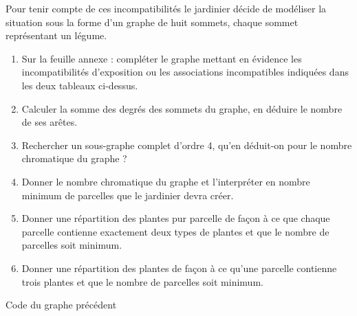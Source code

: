 Pour tenir compte de ces incompatibilités le jardinier décide de modéliser la situation sous la forme d'un graphe de huit sommets, chaque sommet représentant un légume.
\medskip
\begin{enumerate}
\item Sur la feuille annexe : compléter le graphe mettant en évidence les incompatibilités d'exposition ou les associations incompatibles indiquées dans les deux tableaux ci-dessus.

\item Calculer la somme des degrés des sommets du graphe, en déduire le nombre de ses arêtes.

\item Rechercher un sous-graphe complet d'ordre 4, qu'en déduit-on pour le nombre chromatique du graphe ?

\item Donner le nombre chromatique du graphe et l'interpréter en nombre minimum de parcelles que le jardinier devra créer.

\item Donner une répartition des plantes pur parcelle de façon à ce que chaque parcelle contienne exactement deux types de plantes et que le nombre de parcelles soit minimum.

\item Donner une répartition des plantes de façon à ce qu'une parcelle contienne trois plantes et que le nombre de parcelles soit minimum.
\end{enumerate}

\medskip
\begin{center}
\end{center}

\vfill\newpage
Code du graphe précédent

\bigskip
\begin{tkzexample}
\end{tkzexample}

